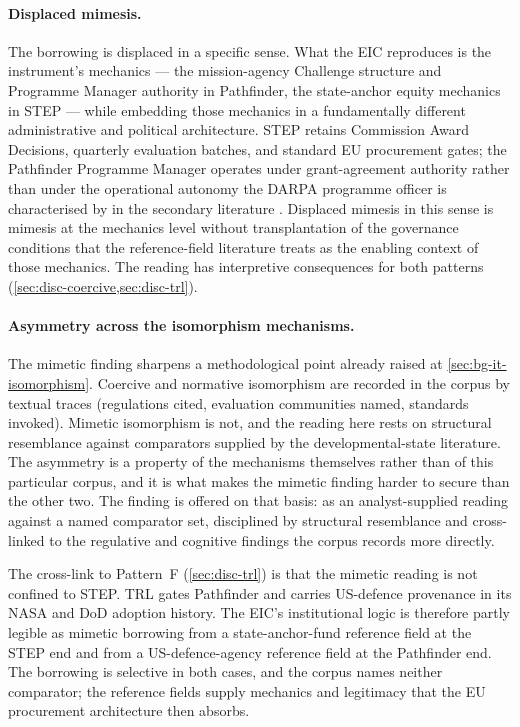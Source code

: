 \paragraph{Displaced mimesis.}
The borrowing is displaced in a specific sense. What the EIC
reproduces is the instrument's mechanics --- the mission-agency
Challenge structure and Programme Manager authority in Pathfinder, the
state-anchor equity mechanics in STEP --- while embedding those
mechanics in a fundamentally different administrative and political
architecture. STEP retains Commission Award Decisions, quarterly
evaluation batches, and standard EU procurement gates; the Pathfinder
Programme Manager operates under grant-agreement authority rather than
under the operational autonomy the DARPA programme officer is
characterised by in the secondary literature
\parencite{bonvillian2018darpa}. Displaced mimesis in this sense is
mimesis at the mechanics level without transplantation of the
governance conditions that the reference-field literature treats as
the enabling context of those mechanics. The reading has interpretive
consequences for both patterns (\cref{sec:disc-coercive,sec:disc-trl}).

\paragraph{Asymmetry across the isomorphism mechanisms.}
The mimetic finding sharpens a methodological point already raised at
\cref{sec:bg-it-isomorphism}. Coercive and normative isomorphism are
recorded in the corpus by textual traces (regulations cited,
evaluation communities named, standards invoked). Mimetic isomorphism
is not, and the reading here rests on structural resemblance against
comparators supplied by the developmental-state literature. The
asymmetry is a property of the mechanisms themselves rather than of
this particular corpus, and it is what makes the mimetic finding
harder to secure than the other two. The finding is offered on that
basis: as an analyst-supplied reading against a named comparator set,
disciplined by structural resemblance and cross-linked to the
regulative and cognitive findings the corpus records more directly.

The cross-link to Pattern~F (\cref{sec:disc-trl}) is that the mimetic
reading is not confined to STEP. TRL gates Pathfinder and carries
US-defence provenance in its NASA and DoD adoption history. The EIC's
institutional logic is therefore partly legible as mimetic borrowing
from a state-anchor-fund reference field at the STEP end and from a
US-defence-agency reference field at the Pathfinder end. The borrowing
is selective in both cases, and the corpus names neither comparator;
the reference fields supply mechanics and legitimacy that the EU
procurement architecture then absorbs.

